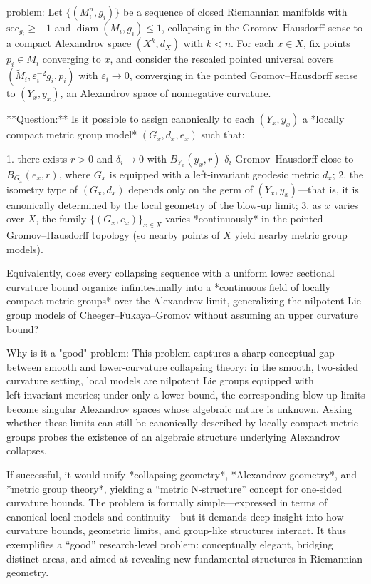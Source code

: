 problem:  
Let $\{(M_i^n,g_i)\}$ be a sequence of closed Riemannian manifolds with $\mathrm{sec}_{g_i}\ge -1$ and $\operatorname{diam}(M_i,g_i)\le1$, collapsing in the Gromov–Hausdorff sense to a compact Alexandrov space $(X^k,d_X)$ with $k<n$.  
For each $x\in X$, fix points $p_i\in M_i$ converging to $x$, and consider the rescaled pointed universal covers $(\widetilde M_i, \varepsilon_i^{-2}g_i,p_i)$ with $\varepsilon_i\to0$, converging in the pointed Gromov–Hausdorff sense to $(Y_x,y_x)$, an Alexandrov space of nonnegative curvature.  

**Question:**  
Is it possible to assign canonically to each $(Y_x,y_x)$ a *locally compact metric group model* $(G_x,d_x,e_x)$ such that:

1. there exists $r>0$ and $\delta_i\to0$ with $B_{Y_x}(y_x,r)$ $\delta_i$‑Gromov–Hausdorff close to $B_{G_x}(e_x,r)$, where $G_x$ is equipped with a left‑invariant geodesic metric $d_x$;
2. the isometry type of $(G_x,d_x)$ depends only on the germ of $(Y_x,y_x)$—that is, it is canonically determined by the local geometry of the blow‑up limit;
3. as $x$ varies over $X$, the family $\{(G_x,e_x)\}_{x\in X}$ varies *continuously* in the pointed Gromov–Hausdorff topology (so nearby points of $X$ yield nearby metric group models).

Equivalently, does every collapsing sequence with a uniform lower sectional curvature bound organize infinitesimally into a *continuous field of locally compact metric groups* over the Alexandrov limit, generalizing the nilpotent Lie group models of Cheeger–Fukaya–Gromov without assuming an upper curvature bound?

Why is it a "good" problem:  
This problem captures a sharp conceptual gap between smooth and lower‑curvature collapsing theory: in the smooth, two‑sided curvature setting, local models are nilpotent Lie groups equipped with left‑invariant metrics; under only a lower bound, the corresponding blow‑up limits become singular Alexandrov spaces whose algebraic nature is unknown. Asking whether these limits can still be canonically described by locally compact metric groups probes the existence of an algebraic structure underlying Alexandrov collapses.  

If successful, it would unify *collapsing geometry*, *Alexandrov geometry*, and *metric group theory*, yielding a “metric N‑structure” concept for one‑sided curvature bounds. The problem is formally simple—expressed in terms of canonical local models and continuity—but it demands deep insight into how curvature bounds, geometric limits, and group‑like structures interact. It thus exemplifies a “good” research‑level problem: conceptually elegant, bridging distinct areas, and aimed at revealing new fundamental structures in Riemannian geometry.
